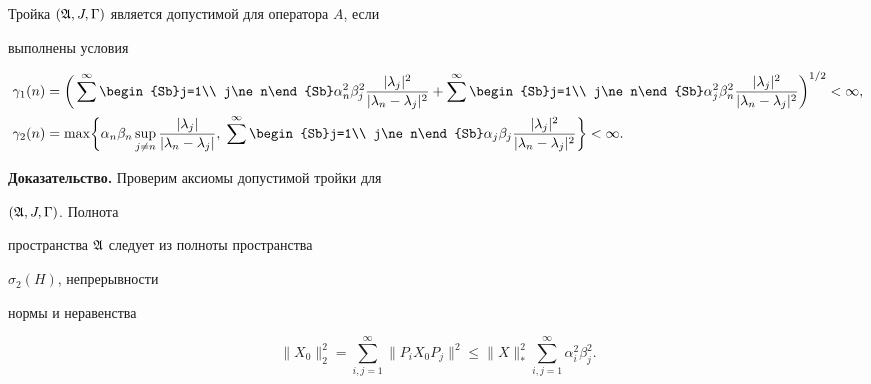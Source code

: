 \begin{lem}


Тройка $(\frak A,J,\Gamma)$ является допустимой для оператора $A$, если


выполнены условия


\begin{align}


\gamma_1(n)&=\biggl(\,


\sum^\infty\begin{Sb}j=1\\ j\ne n\end{Sb}


\alpha^2_n\beta^2_j


\frac{|\lambda_j|^2}{|\lambda_n-\lambda_j|^2}+


\sum^\infty\begin{Sb}j=1\\ j\ne n\end{Sb}


\alpha^2_j\beta^2_n


\frac{|\lambda_j|^2}{|\lambda_n-\lambda_j|^2}\biggr)^{1/2}


<\infty,\\


%


\gamma_2(n)&=\max\biggl\{\alpha_n\beta_n\sup_{j\ne n}


\frac{|\lambda_j|}{|\lambda_n-\lambda_j|},\;


\sum^\infty\begin{Sb}j=1\\ j\ne n\end{Sb}


\alpha_j\beta_j


\frac{|\lambda_j|^2}{|\lambda_n-\lambda_j|^2}\biggr\}<\infty.


\end{align}


\end{lem}





{\bf Доказательство.} Проверим аксиомы допустимой тройки для


$(\frak A,J,\Gamma)$. Полнота


пространства $\frak A$ следует из полноты пространства


$\sigma_2(H)$, непрерывности


нормы и неравенства


\begin{equation}


\|X_0\|^2_2=\sum^\infty_{i,j=1}\|P_iX_0P_j\|^2\le


\|X\|^2_*\sum^\infty_{i,j=1}\alpha^2_i\beta^2_j.


\end{equation}


